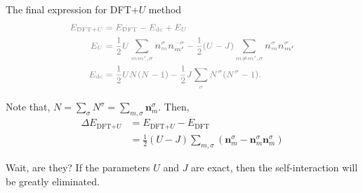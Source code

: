 \documentclass{beamer}
\begin{document}
  \begin{frame}{The final expression for DFT+\(U\) method}
    \begin{equation*}\textcolor{gray}{\small\begin{aligned}
      E_{\text{DFT+}U} &= E_{\text{DFT}} - E_{\text{dc}} + E_{U}\\
      E_U &= \frac{1}{2}U\sum_{mm',\sigma}\bm{n}^\sigma_{m}\bm{n}^{-\sigma}_{\bm{m'}} - \frac{1}{2}(U-J)\sum_{m\ne{}m',\sigma}\bm{n}^\sigma_{m}\bm{n}^{\sigma}_{\bm{m'}}\\
      E_\text{dc} &= \frac{1}{2}UN(N-1) - \frac{1}{2}J\sum_\sigma{}N^\sigma(N^\sigma{}-1).
    \end{aligned}}\end{equation*}

    Note that, \(N = \sum_{\sigma} N^\sigma = \sum_{m,\sigma}\bm{n}^{\sigma}_{m}\). Then,
    \begin{equation}
      \begin{aligned}
        \Delta{}E_{\text{DFT+}U} &= E_{\text{DFT+}U} - E_{\text{DFT}}\\
        &= \frac{1}{2}(U-J)\sum_{m,\sigma}(\bm{n}^{\sigma}_{m} - \bm{n}^{\sigma}_{m}\bm{n}^{\sigma}_{m})
      \end{aligned}
    \end{equation}

    \begin{block}{Wait, are they?}
      If the parameters \(U\) and \(J\) are exact, then the self-interaction will be greatly eliminated.
    \end{block}
  \end{frame}
\end{document}
